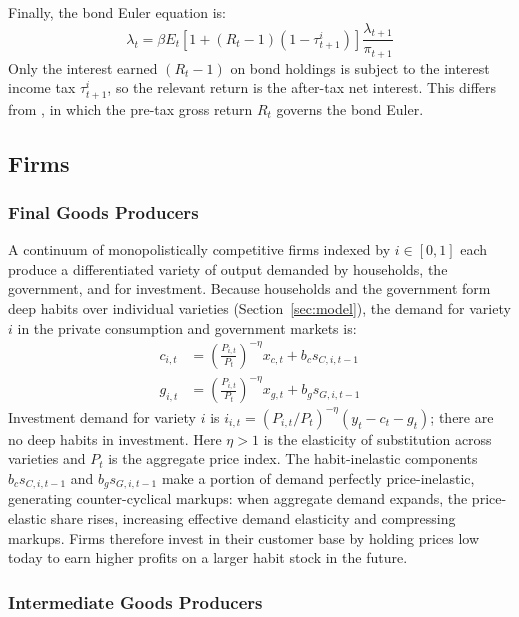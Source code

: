 \documentclass[article,11pt,letterpaper,fleqn]{article}
\theoremstyle{definition}
\numberwithin{equation}{section}
\begin{document}
Finally, the bond Euler equation is:
\begin{equation}\label{eq:bondeuler}
\lambda_t = \beta E_t \!\left[1+(R_t-1)(1-\tau_{t+1}^{i})\right]\frac{\lambda_{t+1}}{\pi_{t+1}}
\end{equation}
Only the interest earned $(R_t-1)$ on bond holdings is subject to the interest income tax $\tau_{t+1}^i$, so the relevant return is the after-tax net interest. This differs from \citet{Zubairy2014}, in which the pre-tax gross return $R_t$ governs the bond Euler.


\subsection{Firms}

\subsubsection{Final Goods Producers}

A continuum of monopolistically competitive firms indexed by $i \in [0,1]$ each produce a differentiated variety of output demanded by households, the government, and for investment. Because households and the government form deep habits over individual varieties (Section~\ref{sec:model}), the demand for variety $i$ in the private consumption and government markets is:
\begin{align}
c_{i,t} &= \left(\frac{P_{i,t}}{P_t}\right)^{-\eta}x_{c,t} + b_c s_{C,i,t-1} \label{eq:cdem} \\
g_{i,t} &= \left(\frac{P_{i,t}}{P_t}\right)^{-\eta}x_{g,t} + b_g s_{G,i,t-1} \label{eq:gdem}
\end{align}
Investment demand for variety $i$ is $i_{i,t} = (P_{i,t}/P_t)^{-\eta}(y_t - c_t - g_t)$; there are no deep habits in investment. Here $\eta > 1$ is the elasticity of substitution across varieties and $P_t$ is the aggregate price index. The habit-inelastic components $b_c s_{C,i,t-1}$ and $b_g s_{G,i,t-1}$ make a portion of demand perfectly price-inelastic, generating counter-cyclical markups: when aggregate demand expands, the price-elastic share rises, increasing effective demand elasticity and compressing markups. Firms therefore invest in their customer base by holding prices low today to earn higher profits on a larger habit stock in the future.

\subsubsection{Intermediate Goods Producers}
\end{document}
